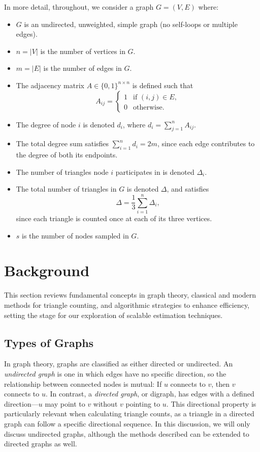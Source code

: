 \documentclass[11pt, margin=1in]{article}
\begin{document}
In more detail, throughout, we consider a graph \( G = (V, E) \) where:
\begin{itemize}
    \item \( G \) is an undirected, unweighted, simple graph (no self-loops or multiple edges).
    \item \( n = |V| \) is the number of vertices in \( G \).
    \item \( m = |E| \) is the number of edges in \( G \).
    \item The adjacency matrix \( A \in \{0,1\}^{n \times n} \) is defined such that
    \[
    A_{ij} =
    \begin{cases}
    1 & \text{if } (i,j) \in E, \\
    0 & \text{otherwise}.
    \end{cases}
    \]
    \item The degree of node \( i \) is denoted \( d_i \), where \( d_i = \sum_{j=1}^{n} A_{ij} \).
    \item The total degree sum satisfies \( \sum_{i=1}^{n} d_i = 2m \), since each edge contributes to the degree of both its endpoints.
    \item The number of triangles node \( i \) participates in is denoted \( \Delta_i \).
    \item The total number of triangles in \( G \) is denoted \( \Delta \), and satisfies
    \[
    \Delta = \frac{1}{3} \sum_{i=1}^{n} \Delta_i,
    \]
    since each triangle is counted once at each of its three vertices.
    \item $s$ is the number of nodes sampled in $G$.
\end{itemize}

\newpage

\section{Background}
\label{sec:background}

This section reviews fundamental concepts in graph theory, classical and modern methods for triangle counting, and algorithmic strategies to enhance efficiency, setting the stage for our exploration of scalable estimation techniques.

\subsection{Types of Graphs}

In graph theory, graphs are classified as either directed or undirected.  
An \emph{undirected graph} is one in which edges have no specific direction, so the relationship between connected nodes is mutual: If $u$ connects to $v$, then $v$ connects to $u$.  
In contrast, a \emph{directed graph}, or digraph, has edges with a defined direction—$u$ may point to $v$ without $v$ pointing to $u$.  
This directional property is particularly relevant when calculating triangle counts, as a triangle in a directed graph can follow a specific directional sequence.  
In this discussion, we will only discuss undirected graphs, although the methods described can be extended to directed graphs as well.
\end{document}
